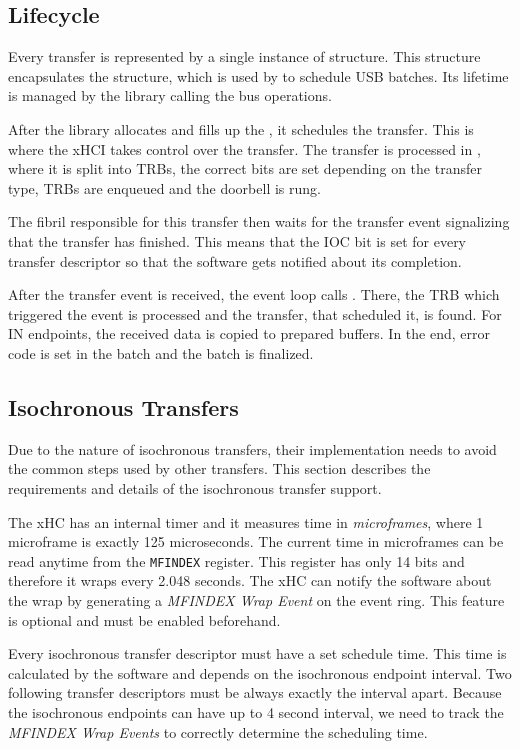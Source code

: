 \subsection{Lifecycle}

Every transfer is represented by a single instance of 
structure. This structure encapsulates the 
structure, which is used by  to schedule USB batches. Its
lifetime is managed by the library calling the bus operations.

After the library allocates and fills up the , it
schedules the transfer. This is where the xHCI takes control over the transfer.
The transfer is processed in , where it is split
into TRBs, the correct bits are set depending on the transfer type, TRBs are
enqueued and the doorbell is rung.

The fibril responsible for this transfer then waits for the transfer event
signalizing that the transfer has finished. This means that the IOC bit is set
for every transfer descriptor so that the software gets notified about its
completion.

After the transfer event is received, the event loop calls
. There, the TRB which triggered the event is
processed and the transfer, that scheduled it, is found. For IN endpoints, the
received data is copied to prepared buffers. In the end, error code is set in
the batch and the batch is finalized.

\subsection{Isochronous Transfers}

Due to the nature of isochronous transfers, their implementation needs to avoid
the common steps used by other transfers. This section describes the
requirements and details of the isochronous transfer support.

The xHC has an internal timer and it measures time in \textit{microframes},
where 1 microframe is exactly 125 microseconds. The current time in microframes
can be read anytime from the \texttt{MFINDEX} register. This register has only
14 bits and therefore it wraps every 2.048 seconds. The xHC can notify the
software about the wrap by generating a \textit{MFINDEX Wrap Event} on the
event ring. This feature is optional and must be enabled beforehand.

Every isochronous transfer descriptor must have a set schedule time. This time
is calculated by the software and depends on the isochronous endpoint interval.
Two following transfer descriptors must be always exactly the interval apart.
Because the isochronous endpoints can have up to 4 second interval, we need to
track the \textit{MFINDEX Wrap Events} to correctly determine the scheduling
time.

